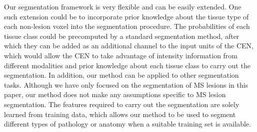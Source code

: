 Our segmentation framework is very flexible and can be easily extended. One such
extension could be to incorporate prior knowledge about the tissue type of each
non-lesion voxel into the segmentation procedure. The probabilities of each
tissue class could be precomputed by a standard segmentation method, after which
they can be added as an additional channel to the input units of the CEN, which
would allow the CEN to take advantage of intensity information from different
modalities and prior knowledge about each tissue class to carry out the
segmentation. In addition, our method can be applied to other segmentation
tasks. Although we have only focused on the segmentation of MS lesions in this
paper, our method does not make any assumptions specific to MS lesion
segmentation. The features required to carry out the segmentation are solely
learned from training data, which allows our method to be used to segment
different types of pathology or anatomy when a suitable training set is
available.
